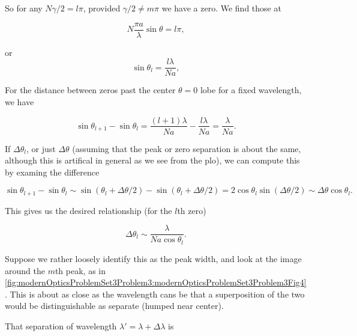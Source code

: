 {So for any $N \gamma/2 = l \pi$, provided $\gamma/2 \ne m \pi$ we have a zero.  We find those at

\begin{dmath}\label{eqn:modernOptics:problemSet3:3:380}
N \frac{\pi a}{\lambda} \sin\theta = l \pi,
\end{dmath}

or
\begin{dmath}\label{eqn:modernOptics:problemSet3:3:400}
\sin\theta_l = \frac{l \lambda}{N a},
\end{dmath}

For the distance between zeros past the center $\theta = 0$ lobe for a fixed wavelength, we have

\begin{dmath}\label{eqn:modernOptics:problemSet3:3:420}
\sin\theta_{l+1} - \sin\theta_l = 
\frac{(l+1) \lambda}{N a}
-
\frac{l \lambda}{N a}
=
\frac{\lambda}{N a}.
\end{dmath}

If $\Delta \theta_l$, or just $\Delta \theta$ (assuming that the peak or zero separation is about the same, although this is artifical in general as we see from the plo), we can compute this by examing the difference

\begin{dmath}\label{eqn:modernOptics:problemSet3:3:440}
\sin\theta_{l+1} - \sin\theta_l 
\sim 
\sin(\theta_l + \Delta \theta/2)
-\sin(\theta_l + \Delta \theta/2)
= 2 \cos \theta_l \sin (\Delta \theta/2)
\sim \Delta \theta \cos\theta_l.
\end{dmath}

This gives us the desired relationship (for the $l$th zero)

\begin{dmath}\label{eqn:modernOptics:problemSet3:3:460}
\boxed{
\Delta \theta_l \sim \frac{\lambda}{N a \cos\theta_l}.
}
\end{dmath}

Suppose we rather loosely identify this as the peak width, and look at the image around the $m$th peak, as in \cref{fig:modernOpticsProblemSet3Problem3:modernOpticsProblemSet3Problem3Fig4}.  This is about as close as the wavelength cans be that a superposition of the two would be distinguishable as separate (humped near center).


That separation of wavelength $\lambda' = \lambda + \Delta \lambda$ is

}

